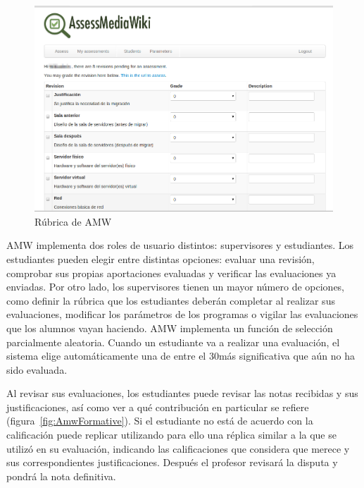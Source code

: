 \begin{figure}
  \begin{center}
    \includegraphics[scale=0.3]{AmwRubrica.png}
  \end{center}
  \caption{Rúbrica de AMW}
  \label{fig:AmwRubrica}
\end{figure}

AMW implementa dos roles de usuario distintos: supervisores y estudiantes. Los estudiantes pueden elegir entre distintas opciones: evaluar una revisión, comprobar sus propias aportaciones evaluadas y verificar las evaluaciones ya enviadas. Por otro lado, los supervisores tienen un mayor número de opciones, como definir la rúbrica que los estudiantes deberán completar al realizar sus evaluaciones, modificar los parámetros de los programas o vigilar las evaluaciones que los alumnos vayan haciendo. AMW implementa un función de selección parcialmente aleatoria. Cuando un estudiante va a realizar una evaluación, el sistema elige automáticamente una de entre el 30\percentage más significativa que aún no ha sido evaluada.

Al revisar sus evaluaciones, los estudiantes puede revisar las notas recibidas y sus justificaciones, así como ver a qué contribución en particular se refiere (figura~\ref{fig:AmwFormative}). Si el estudiante no está de acuerdo con la calificación puede replicar utilizando para ello una réplica similar a la que se utilizó en su evaluación, indicando las calificaciones que considera que merece y sus correspondientes justificaciones. Después el profesor revisará la disputa y pondrá la nota definitiva.

